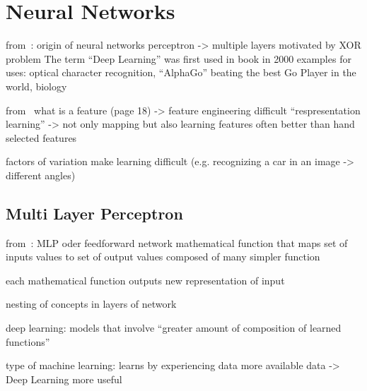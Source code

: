 



\section{Neural Networks}\label{sec:dnn}

from~\autocite{sonnet2022NeuralBoook}:
origin of neural networks
perceptron -> multiple layers motivated by XOR problem
The term \enquote{Deep Learning} was first used in book in 2000
examples for uses: optical character recognition, \enquote{AlphaGo} beating the best Go Player in the world, biology


from~\autocite{Goodfellow-et-al-2016}
what is a feature (page 18) -> feature engineering difficult
\enquote{respresentation learning} -> not only mapping but also learning features
often better than hand selected features

factors of variation make learning difficult (e.g. recognizing a car in an image -> different angles)


\subsection{Multi Layer Perceptron}\label{subsec:multi-layer-perceptron}
from~\autocite{Goodfellow-et-al-2016}:
MLP oder feedforward network
mathematical function that maps set of inputs values to set of output values
composed of many simpler function

each mathematical function outputs new representation of input

nesting of concepts in layers of network

deep learning: models that involve \enquote{greater amount of  composition of learned functions}

type of machine learning: learns by experiencing data
more available data -> Deep Learning more useful

